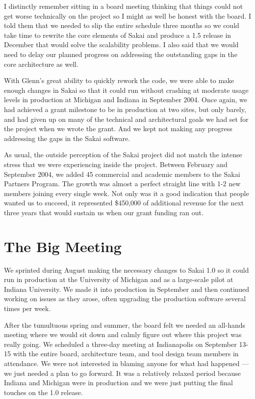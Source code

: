 \documentclass[12pt]{book}
\begin{document}
I distinctly remember sitting in a board meeting
thinking that things could not get worse
technically on the project so I might as well
be honest with the board.  I told them that
we needed to slip the entire schedule three
months so we could take time to
rewrite the core elements of Sakai and produce
a 1.5 release in December that would solve
the scalability problems.  I also said
that we would need to delay our planned progress
on addressing the outstanding gaps in the
core architecture as well.

With Glenn's great ability to quickly rework
the code, we were able to make enough changes
in Sakai so that it could run without crashing
at moderate usage levels in production
at Michigan and Indiana in September 2004.
Once again, we had achieved a grant milestone
to be in production at two sites,
but only barely, and had given up on many
of the technical and architectural
goals we had set for the project when we wrote the grant.
And we kept not making any progress addressing
the gaps in the Sakai software.

As usual, the outside perception of the
Sakai project did not match the intense stress
that we were experiencing inside the project.
Between February and September 2004, we added
45 commercial and academic members to the Sakai
Partners Program.  The growth was almost a
perfect straight line with 1-2 new members joining
every single week.  Not only was it a good
indication that people wanted us to succeed,
it represented \$450,000 of additional revenue
for the next three years that would sustain us
when our grant funding ran out.

\chapter{The Big Meeting}

We sprinted during August making the necessary changes
to Sakai 1.0 so it could run in production at the
University of Michigan and as a large-scale pilot
at Indiana University.  We made it into production
in September and then continued working on issues as they
arose, often upgrading the production software several
times per week.

After the tumultuous spring and summer, the board felt we
needed an all-hands meeting where we would sit down
and calmly figure out where this project was really going.
We scheduled a three-day meeting at Indianapolis
on September 13-15 with the entire board, architecture team,
and tool design team members in attendance.  We were not
interested in blaming anyone for what had happened --- we
just needed a plan to go forward. It was a relatively
relaxed period because Indiana and Michigan were in
production and we were just putting the final touches on
the 1.0 release.
\end{document}
